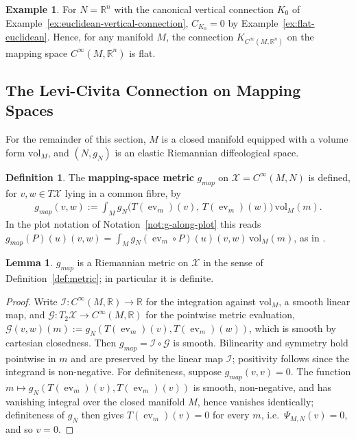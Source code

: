 \documentclass{amsart}
\newcommand{\R}{\mathbb{R}}
\newcommand{\vol}{\mathrm{vol}}
\newcommand{\X}{\mathcal{X}}
\DeclareMathOperator{\evl}{ev}
\theoremstyle{definition}
\newtheorem{defn}[thm]{Definition}
\newtheorem{lem}[thm]{Lemma}
\newtheorem{ex}[thm]{Example}
\begin{document}
\begin{ex}\label{ex:flat-mapping-space}
  For $N = \R^n$ with the canonical vertical connection $K_0$ of Example~\ref{ex:euclidean-vertical-connection}, $C_{K_0} = 0$ by Example~\ref{ex:flat-euclidean}. Hence, for any manifold $M$, the connection $K_{C^\infty(M, \R^n)}$ on the mapping space $C^\infty(M, \R^n)$ is flat.
\end{ex}

\subsection{The Levi-Civita Connection on Mapping Spaces}%
\label{subsec:mapping-lc}

For the remainder of this section, $M$ is a closed manifold equipped with a
volume form $\vol_M$, and
$(N, g_N)$ is an elastic Riemannian diffeological space.

\begin{defn}\label{def:g-map}
  The \textbf{mapping-space metric} $g_{\mathit{map}}$ on $\X = C^\infty(M, N)$ is defined, for $v, w \in T\X$ lying in a common
  fibre, by
  \begin{align*}
    g_{\mathit{map}}(v, w)
      := \int_M g_N\bigl(T(\evl_m)(v),\, T(\evl_m)(w)\bigr)\, \vol_M(m).
  \end{align*}
  In the plot notation of Notation~\ref{not:g-along-plot} this reads $g_{\mathit{map}}(P)(u)(v, w) = \int_M g_N(\evl_m \circ P)(u)(v, w)\,\vol_M(m)$, as in \cite{KSS}.
\end{defn}

\begin{lem}\label{lem:g-map-metric}
  $g_{\mathit{map}}$ is a Riemannian metric on $\X$ in the sense of
  Definition~\ref{def:metric}; in particular it is definite.
\end{lem}

\begin{proof}
  Write $\mathcal{I} \colon C^\infty(M, \R) \to \R$ for the integration against $\vol_M$, a smooth linear map, and $\mathcal{G} \colon T_2\X \to C^\infty(M, \R)$ for the pointwise metric evaluation, $\mathcal{G}(v, w)(m) := g_N(T(\evl_m)(v), T(\evl_m)(w))$, which is smooth by cartesian closedness. 
  Then $g_{\mathit{map}} = \mathcal{I} \circ \mathcal{G}$ is smooth. 
  Bilinearity and symmetry hold pointwise in $m$ and are preserved by the linear map $\mathcal{I}$; positivity follows since the integrand is non-negative. For definiteness, suppose $g_{\mathit{map}}(v, v) = 0$. 
  The function $m \mapsto g_N(T(\evl_m)(v), T(\evl_m)(v))$ is smooth, non-negative, and has vanishing integral over the closed manifold $M$, hence vanishes identically; definiteness of $g_N$ then gives $T(\evl_m)(v) = 0$ for every $m$, i.e.\ $\Psi_{M,N}(v) = 0$, and so $v = 0$.
\end{proof}
\end{document}
